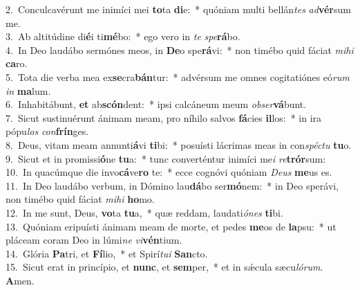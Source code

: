 {2.~}Conculcavérunt me inimíci mei \textbf{to}ta \textbf{di}e:~* quóniam multi bellán\textit{tes} \textit{ad}\textbf{vér}sum me.\\
{3.~}Ab altitúdine di\textbf{é}i ti\textbf{mé}bo:~* ego vero in \textit{te} \textit{spe}\textbf{rá}bo.\\
{4.~}In Deo laudábo sermónes meos, in \textbf{De}o spe\textbf{rá}vi:~* non timébo quid fáciat \textit{mi}\textit{hi} \textbf{ca}ro.\\
{5.~}Tota die verba mea ex\textbf{se}cra\textbf{bán}tur:~* advérsum me omnes cogitatiónes eó\textit{rum} \textit{in} \textbf{ma}lum.\\
{6.~}Inhabitábunt, \textbf{et} ab\textbf{scón}dent:~* ipsi calcáneum meum \textit{ob}\textit{ser}\textbf{vá}bunt.\\
{7.~}Sicut sustinuérunt ánimam meam, pro níhilo salvos \textbf{fá}cies \textbf{il}los:~* in ira pópu\textit{los} \textit{con}\textbf{frín}ges.\\
{8.~}Deus, vitam meam annunti\textbf{á}vi \textbf{ti}bi:~* posuísti lácrimas meas in con\textit{spé}\textit{ctu} \textbf{tu}o.\\
{9.~}Sicut et in promissi\textbf{ó}ne \textbf{tu}a:~* tunc converténtur inimíci me\textit{i} \textit{re}\textbf{trór}sum:\\
{10.~}In quacúmque die invo\textbf{cá}ve\textbf{ro} te:~* ecce cognóvi quóniam \textit{De}\textit{us} \textbf{me}us es.\\
{11.~}In Deo laudábo verbum, in Dómino lau\textbf{dá}bo ser\textbf{mó}nem:~* in Deo sperávi, non timébo quid fáciat \textit{mi}\textit{hi} \textbf{ho}mo.\\
{12.~}In me sunt, Deus, \textbf{vo}ta \textbf{tu}a,~* quæ reddam, laudati\textit{ó}\textit{nes} \textbf{ti}bi.\\
{13.~}Quóniam eripuísti ánimam meam de morte, et pedes \textbf{me}os de \textbf{la}psu:~* ut pláceam coram Deo in lúmi\textit{ne} \textit{vi}\textbf{vén}tium.\\
{14.~}Glória \textbf{Pa}tri, et \textbf{Fí}lio,~* et Spirí\textit{tu}\textit{i} \textbf{San}cto.\\
{15.~}Sicut erat in princípio, et \textbf{nunc}, et \textbf{sem}per,~* et in sǽcula sæcu\textit{ló}\textit{rum}. \textbf{A}men.\\
